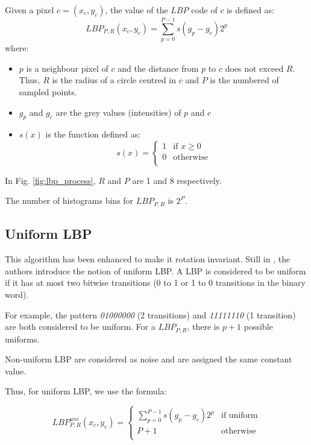 Given a pixel $c = (x_c, y_c)$, the value of the $LBP$ code of $c$ is defined as:
$$LBP_{P, R} (x_c, y_c) = \sum_{p = 0}^{P - 1} s (g_p - g_c) 2^p$$
where:
\begin{itemize}
    \item $p$ is a neighbour pixel of $c$ and the distance from $p$ to $c$ does not exceed $R$. Thus, $R$ is the radius of a circle centred in $c$ and $P$ is the numbered of sampled points.
    \item $g_p$ and $g_c$ are the grey values (intensities) of $p$ and $c$
    \item $s(x)$ is the function defined as:
    \begin{equation}
    s(x) =
    \begin{cases}
    1 & \text{if $x \geq 0$}\\
    0 & \text{otherwise} \\
    \end{cases}
    \end{equation}
\end{itemize}

In Fig. \ref{fig:lbp_process}, $R$ and $P$ are 1 and 8 respectively.

The number of histograms bins for $LBP_{P, R}$ is $2^P$.

\subsection{Uniform LBP}

This algorithm has been enhanced to make it rotation invariant. Still in \cite{Ojala2002}, the authors introduce the notion of uniform LBP. A LBP is considered to be uniform if it has at most two bitwise transitions (0 to 1 or 1 to 0 transitions in the binary word). 

For example, the pattern \textit{01000000}  (2 transitions) and \textit{11111110} (1 transition) are both considered to be uniform. For a $LBP_{P, R}$, there is $p + 1$ possible uniforms.

Non-uniform LBP are considered as noise and are assigned the same constant value.

Thus, for uniform LBP, we use the formula:

$$
LBP_{P, R}^{uni} (x_c, y_c) = 
\begin{cases} \displaystyle
\sum_{p = 0}^{P - 1} s (g_p - g_c) 2^p & \text{if uniform} \\
P + 1 & \text{otherwise} \\
\end{cases}
$$

